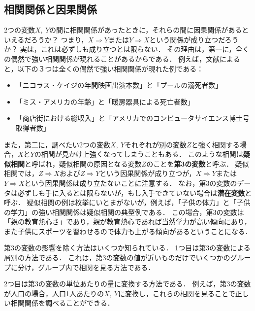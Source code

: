 \subsection{相関関係と因果関係}
%
2つの変数$ X,\ Y $の間に相関関係があったときに，それらの間に因果関係があるといえるだろうか？
%
つまり，$ X\Rightarrow Y $または$ Y \Rightarrow X $という関係が成り立つだろうか？
%
実は，これは必ずしも成り立つとは限らない．
%
その理由は，第一に，全くの偶然で強い相関関係が現れることがあるからである．
%
例えば，文献\cite{h}によると，以下の３つは全くの偶然で強い相関関係が現れた例である：
%
\begin{itemize}
\item
「ニコラス・ケイジの年間映画出演本数」と「プールの溺死者数」
\item
「ミス・アメリカの年齢」と「暖房器具による死亡者数」
\item
「商店街における総収入」と「アメリカでのコンピュータサイエンス博士号取得者数」 
\end{itemize}
%

%
また，第二に，調べたい2つの変数$ X,\ Y $それぞれが別の変数$ Z $と強く相関する場合，$ X $と$ Y $の相関が見かけ上強くなってしまうこともある．
%
このような相関は\textbf{疑似相関}と呼ばれ，疑似相関の原因となる変数$ Z $のことを\textbf{第3の変数}と呼ぶ．
%
疑似相関では，$ Z \Rightarrow X $および$ Z \Rightarrow Y $という因果関係が成り立つが，$ X\Rightarrow Y $または$ Y \Rightarrow X $という因果関係は成り立たないことに注意する．
%
なお，第3の変数のデータは必ずしも手に入るとは限らないが，もし入手できていない場合は\textbf{潜在変数}と呼ぶ．
%
疑似相関の例は枚挙にいとまがないが，例えば，「子供の体力」と「子供の学力」の強い相関関係は疑似相関の典型例である．
%
この場合，第3の変数は「親の教育熱心さ」であり，親が教育熱心であれば当然学力が高い傾向にあり，また子供にスポーツを習わせるので体力も上がる傾向があるということになる．
%

%
第3の変数の影響を除く方法はいくつか知られている．
%
1つ目は第3の変数による層別の方法である．
%
これは，第3の変数の値が近いものだけでいくつかのグループに分け，グループ内で相関を見る方法である．
%

%
2つ目は第3の変数の単位あたりの量に変換する方法である．
%
例えば，第3の変数が人口の場合，人口1人あたりの$ X,\ Y $に変換し，これらの相関を見ることで正しい相関関係を調べることができる．
%

